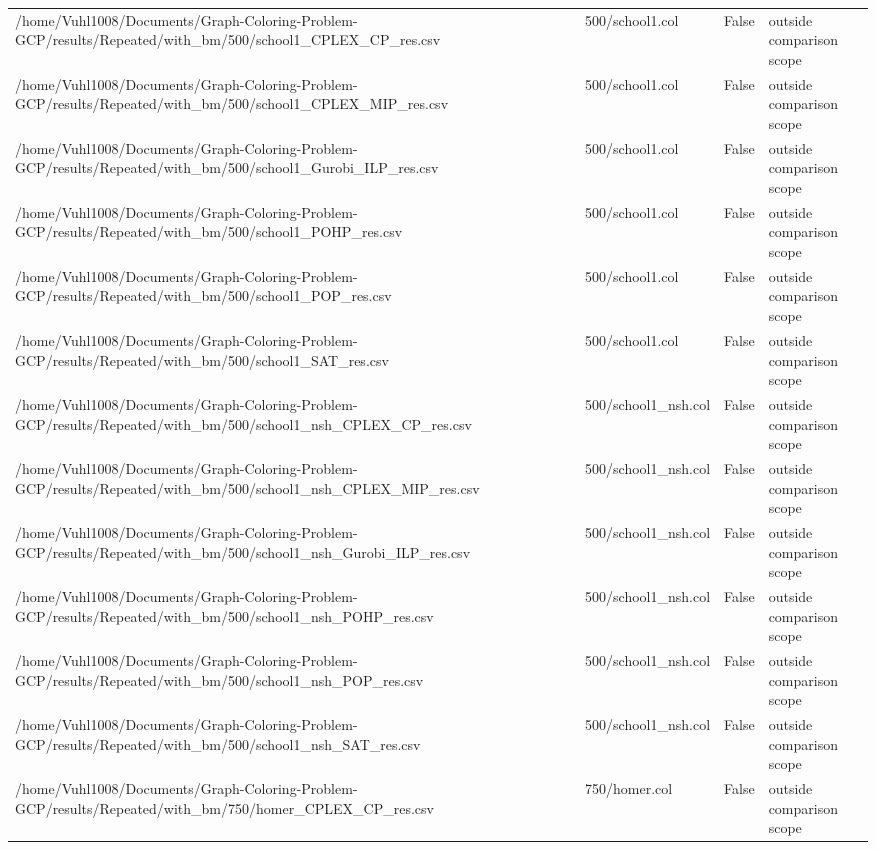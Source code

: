 \begin{table}[htbp]
\begin{tabular}{llll}
/home/Vuhl1008/Documents/Graph-Coloring-Problem-GCP/results/Repeated/with\_bm/500/school1\_CPLEX\_CP\_res.csv & 500/school1.col & False & outside comparison scope \\
/home/Vuhl1008/Documents/Graph-Coloring-Problem-GCP/results/Repeated/with\_bm/500/school1\_CPLEX\_MIP\_res.csv & 500/school1.col & False & outside comparison scope \\
/home/Vuhl1008/Documents/Graph-Coloring-Problem-GCP/results/Repeated/with\_bm/500/school1\_Gurobi\_ILP\_res.csv & 500/school1.col & False & outside comparison scope \\
/home/Vuhl1008/Documents/Graph-Coloring-Problem-GCP/results/Repeated/with\_bm/500/school1\_POHP\_res.csv & 500/school1.col & False & outside comparison scope \\
/home/Vuhl1008/Documents/Graph-Coloring-Problem-GCP/results/Repeated/with\_bm/500/school1\_POP\_res.csv & 500/school1.col & False & outside comparison scope \\
/home/Vuhl1008/Documents/Graph-Coloring-Problem-GCP/results/Repeated/with\_bm/500/school1\_SAT\_res.csv & 500/school1.col & False & outside comparison scope \\
/home/Vuhl1008/Documents/Graph-Coloring-Problem-GCP/results/Repeated/with\_bm/500/school1\_nsh\_CPLEX\_CP\_res.csv & 500/school1\_nsh.col & False & outside comparison scope \\
/home/Vuhl1008/Documents/Graph-Coloring-Problem-GCP/results/Repeated/with\_bm/500/school1\_nsh\_CPLEX\_MIP\_res.csv & 500/school1\_nsh.col & False & outside comparison scope \\
/home/Vuhl1008/Documents/Graph-Coloring-Problem-GCP/results/Repeated/with\_bm/500/school1\_nsh\_Gurobi\_ILP\_res.csv & 500/school1\_nsh.col & False & outside comparison scope \\
/home/Vuhl1008/Documents/Graph-Coloring-Problem-GCP/results/Repeated/with\_bm/500/school1\_nsh\_POHP\_res.csv & 500/school1\_nsh.col & False & outside comparison scope \\
/home/Vuhl1008/Documents/Graph-Coloring-Problem-GCP/results/Repeated/with\_bm/500/school1\_nsh\_POP\_res.csv & 500/school1\_nsh.col & False & outside comparison scope \\
/home/Vuhl1008/Documents/Graph-Coloring-Problem-GCP/results/Repeated/with\_bm/500/school1\_nsh\_SAT\_res.csv & 500/school1\_nsh.col & False & outside comparison scope \\
/home/Vuhl1008/Documents/Graph-Coloring-Problem-GCP/results/Repeated/with\_bm/750/homer\_CPLEX\_CP\_res.csv & 750/homer.col & False & outside comparison scope \\

\end{tabular}
\end{table}
